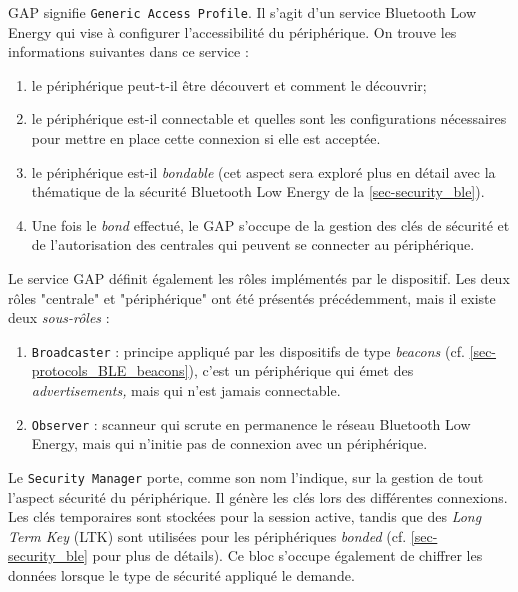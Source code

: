\label{sec-protocols_BLE_GAP}

GAP signifie \texttt{Generic Access Profile}. Il s'agit d'un service Bluetooth Low Energy qui vise à configurer l'accessibilité du périphérique. On trouve les informations suivantes dans ce service : 
\begin{enumerate}
    \item le périphérique peut-t-il être découvert et comment le découvrir;
    \item le périphérique est-il connectable et quelles sont les configurations nécessaires pour mettre en place cette connexion si elle est acceptée.
    \item le périphérique est-il \textit{bondable} (cet aspect sera exploré plus en détail avec la thématique de la sécurité Bluetooth Low Energy de la \cref{sec-security_ble}). 
    \item Une fois le \textit{bond} effectué, le GAP s'occupe de la gestion des clés de sécurité et de l'autorisation des centrales qui peuvent se connecter au périphérique.
\end{enumerate}

Le service GAP définit également les rôles implémentés par le dispositif. Les deux rôles "centrale" et "périphérique" ont été présentés précédemment, mais il existe deux \textit{sous-rôles} : 
 
\begin{enumerate}
    \item \texttt{Broadcaster} : principe appliqué par les dispositifs de type \textit{beacons} (cf. \cref{sec-protocols_BLE_beacons}), c'est un périphérique qui émet des \textit{advertisements,} mais qui n'est jamais connectable.
    \item \texttt{Observer} : scanneur qui scrute en permanence le réseau Bluetooth Low Energy, mais qui n'initie pas de connexion avec un périphérique.
\end{enumerate}

\label{sec-protocols_BLE_security_manager}

Le \texttt{Security Manager} porte, comme son nom l'indique, sur la gestion de tout l'aspect sécurité du périphérique. Il génère les clés lors des différentes connexions. Les clés temporaires sont stockées pour la session active, tandis que des \textit{Long Term Key} (LTK) sont utilisées pour les périphériques \textit{bonded} (cf. \cref{sec-security_ble} pour plus de détails). Ce bloc s'occupe également de chiffrer les données lorsque le type de sécurité appliqué le demande.


